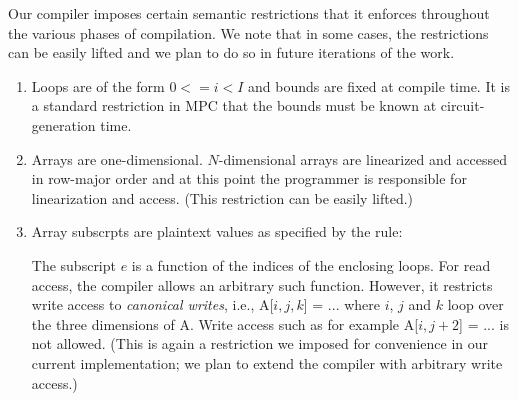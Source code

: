 Our compiler imposes certain semantic restrictions that it enforces throughout the various
phases of compilation. We note that in some cases, the restrictions
can be easily lifted and we plan to do so in future iterations of the work.

\begin{enumerate}
\item Loops are of the form $0 <= i < I$ and bounds are fixed at compile time.
It is a standard restriction in MPC that the bounds must be known at circuit-generation time.
\item Arrays are one-dimensional. $N$-dimensional arrays are linearized and accessed
in row-major order and at this point the programmer is responsible for linearization
and access. (This restriction can be easily lifted.)
\item Array subscrpts are plaintext values as specified by the rule:
\begin{semantics}
\end{semantics}
The subscript $e$ is a function of the indices of the enclosing loops.
For read access, the compiler allows an arbitrary such function.
However, it restricts write access to \emph{canonical writes}, i.e., {\sf A[$i,j,k$] = ...}
where $i$, $j$ and $k$ loop over the three dimensions of {\sf A}.
Write access such as for example {\sf A[$i,j+2$] = ...} is not allowed. (This is again a restriction we imposed for convenience in our current implementation; we plan to extend the compiler with arbitrary write access.)

\end{enumerate}

